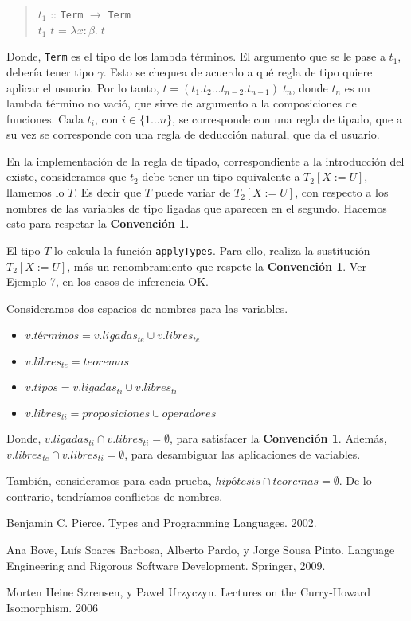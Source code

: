 \documentclass[a4paper,11pt]{article}
\theoremstyle{definition}
\begin{document}
\begin{verse}
  $t_{1}$ :: \texttt{Term} $\rightarrow$  \texttt{Term} \\
  $t_{1}$ $t$ = $\lambda x:\beta. \; t$
\end{verse}

Donde, \texttt{Term} es el tipo de los lambda términos. El argumento que se le pase a $t_{1}$, debería tener tipo $\gamma$.
Esto se chequea de acuerdo a qué regla de tipo quiere aplicar el usuario.
Por lo tanto, $t = (t_{1} . t_{2} \dots t_{n-2} . t_{n-1}) \; t_{n}$, donde $t_{n}$ es un lambda término no vació, que sirve de argumento a la composiciones
de funciones. Cada $t_{i}$, con $i \in \{ 1 \dots n \}$, se corresponde con una regla de tipado, que a su vez se corresponde con una regla de deducción natural, 
que da el usuario.

En la implementación de la regla de tipado, correspondiente a la introducción del existe, consideramos que $t_{2}$ debe tener un tipo equivalente
a $T_{2}[X:=U]$, llamemos lo $T$. Es decir que $T$ puede variar de $T_{2}[X:=U]$, con respecto a los nombres de las variables de tipo ligadas que aparecen en 
el segundo.
Hacemos esto para respetar la \textbf{Convención 1}. 
  
El tipo $T$ lo calcula la función \texttt{applyTypes}. Para ello, realiza la sustitución $T_{2}[X:=U]$, más un renombramiento que respete la \textbf{Convención 1}.
Ver Ejemplo 7, en los casos de inferencia OK.
  
Consideramos dos espacios de nombres para las variables.
\begin{itemize}
\item $v.términos = v.ligadas_{te} \cup v.libres_{te}$
\item $v.libres_{te} = teoremas$
\item $v.tipos = v.ligadas_{ti} \cup v.libres_{ti}$
\item $v.libres_{ti} = proposiciones \cup operadores$
\end{itemize}

Donde, $v.ligadas_{ti} \cap v.libres_{ti} = \emptyset$, para satisfacer la \textbf{Convención 1}.
Además, $v.libres_{te} \cap v.libres_{ti} = \emptyset$, para desambiguar las aplicaciones de variables.

También, consideramos para cada prueba, $hipótesis \cap teoremas = \emptyset$. De lo contrario, tendríamos conflictos de nombres.


\begin{thebibliography}{9}
  Benjamin C. Pierce. 
  Types and Programming Languages. 2002.

  Ana Bove, Luís Soares Barbosa,
  Alberto Pardo, y
  Jorge Sousa Pinto.
  Language Engineering and Rigorous Software Development.
  Springer, 2009.

  Morten Heine Sørensen, y Pawel Urzyczyn.
  Lectures on the Curry-Howard Isomorphism.
  2006

\end{thebibliography}
\end{document}
